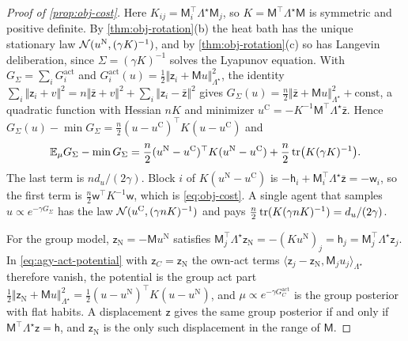 \begin{proof}[Proof of \cref{prop:obj-cost}]
Here $K_{ij}=\mathsf M_i^\top\Lambda^\star\mathsf M_j$, so $K=\mathsf M^\top\Lambda^\star\mathsf M$ is symmetric and positive definite. By \cref{thm:obj-rotation}(b) the heat bath has the unique stationary law $\mathcal{N}(u^{\mathrm N},(\gamma K)^{-1})$, and by \cref{thm:obj-rotation}(c) so has Langevin deliberation, since $\Sigma=(\gamma K)^{-1}$ solves the Lyapunov equation. With $G_\Sigma=\sum_iG^{\mathrm{act}}_i$ and $G^{\mathrm{act}}_i(u)=\frac12\Vert\mathsf z_i+\mathsf Mu\Vert^2_{\Lambda^\star}$, the identity $\sum_i\Vert\mathsf z_i+v\Vert^2=n\Vert\bar{\mathsf z}+v\Vert^2+\sum_i\Vert\mathsf z_i-\bar{\mathsf z}\Vert^2$ gives $G_\Sigma(u)=\frac n2\Vert\bar{\mathsf z}+\mathsf Mu\Vert^2_{\Lambda^\star}+\text{const}$, a quadratic function with Hessian $nK$ and minimizer $u^{\mathrm C}=-K^{-1}\mathsf M^\top\Lambda^\star\bar{\mathsf z}$. Hence $G_\Sigma(u)-\min G_\Sigma=\frac n2(u-u^{\mathrm C})^\top K(u-u^{\mathrm C})$ and
\begin{equation*}
\mathbb{E}_\mu G_\Sigma-\min G_\Sigma=\frac n2(u^{\mathrm N}-u^{\mathrm C})^\top K(u^{\mathrm N}-u^{\mathrm C})+\frac n2\operatorname{tr}\bigl(K(\gamma K)^{-1}\bigr).
\end{equation*}
The last term is $nd_u/(2\gamma)$. Block $i$ of $K(u^{\mathrm N}-u^{\mathrm C})$ is $-\mathsf h_i+\mathsf M_i^\top\Lambda^\star\bar{\mathsf z}=-\mathsf w_i$, so the first term is $\frac n2\mathsf w^\top K^{-1}\mathsf w$, which is \eqref{eq:obj-cost}. A single agent that samples $u\propto e^{-\gamma G_\Sigma}$ has the law $\mathcal{N}(u^{\mathrm C},(\gamma nK)^{-1})$ and pays $\frac n2\operatorname{tr}(K(\gamma nK)^{-1})=d_u/(2\gamma)$.

For the group model, $\mathsf z_{\mathrm N}=-\mathsf Mu^{\mathrm N}$ satisfies $\mathsf M_j^\top\Lambda^\star\mathsf z_{\mathrm N}=-(Ku^{\mathrm N})_j=\mathsf h_j=\mathsf M_j^\top\Lambda^\star\mathsf z_j$. In \eqref{eq:agy-act-potential} with $\mathsf z_C=\mathsf z_{\mathrm N}$ the own-act terms $\langle\mathsf z_j-\mathsf z_{\mathrm N},\mathsf M_ju_j\rangle_{\Lambda^\star}$ therefore vanish, the potential is the group act part $\frac12\Vert\mathsf z_{\mathrm N}+\mathsf Mu\Vert^2_{\Lambda^\star}=\frac12(u-u^{\mathrm N})^\top K(u-u^{\mathrm N})$, and $\mu\propto e^{-\gamma G^{\mathrm{act}}_C}$ is the group posterior with flat habits. A displacement $\mathsf z$ gives the same group posterior if and only if $\mathsf M^\top\Lambda^\star\mathsf z=\mathsf h$, and $\mathsf z_{\mathrm N}$ is the only such displacement in the range of $\mathsf M$.


\end{proof}
